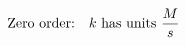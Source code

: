 \documentclass[preview]{standalone}
\begin{document}
\begin{align*}
\special{dvisvgm:raw <g id='unique000'>}\text{Zero order:} \quad k \text{ has units } \frac{M}{s}\special{dvisvgm:raw </g>}
\end{align*}
\end{document}
